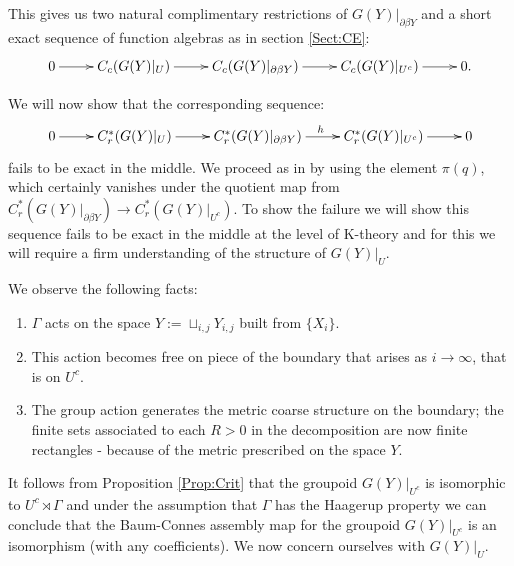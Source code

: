 \documentclass[11pt]{amsart}
\theoremstyle{plain}
\theoremstyle{definition}%
\theoremstyle{remark}%
\begin{document}
This gives us two natural complimentary restrictions of $G(Y)|_{\partial\beta Y}$ and a short exact sequence of function algebras as in section \ref{Sect:CE}:
\begin{equation*}
\xymatrix{
0 \ar[r] & C_{c}(G(Y)|_{U}) \ar[r]& C_{c}(G(Y)|_{\partial\beta Y}) \ar[r] & C_{c}(G(Y)|_{U^{c}}) \ar[r] & 0.
}
\end{equation*}

We will now show that the corresponding sequence:
\begin{equation*}
\xymatrix{
0 \ar[r] & C^{*}_{r}(G(Y)|_{U}) \ar[r]& C_{r}^{*}(G(Y)|_{\partial\beta Y}) \ar[r]^{h} & C_{r}^{*}(G(Y)|_{U^{c}}) \ar[r] & 0
}
\end{equation*}
fails to be exact in the middle. We proceed as in \cite{explg1,MR1911663} by using the element $\pi(q)$, which certainly vanishes under the quotient map from $C^{*}_{r}(G(Y)|_{\partial\beta Y}) \rightarrow C^{*}_{r}(G(Y)|_{U^{c}})$. To show the failure we will show this sequence fails to be exact in the middle at the level of K-theory and for this we will require a firm understanding of the structure of $G(Y)|_{U}$.

We observe the following facts: 
\begin{enumerate}
\item $\Gamma$ acts on the space $Y:=\sqcup_{i,j}Y_{i,j}$ built from $\lbrace X_{i} \rbrace$.
\item This action becomes free on piece of the boundary that arises as $i \rightarrow \infty$, that is on $U^{c}$.
\item The group action generates the metric coarse structure on the boundary; the finite sets associated to each $R>0$ in the decomposition are now finite rectangles - because of the metric prescribed on the space $Y$.
\end{enumerate} 

It follows from Proposition \ref{Prop:Crit} that the groupoid $G(Y)|_{U^{c}}$ is isomorphic to $U^{c}\rtimes \Gamma$ and under the assumption that $\Gamma$ has the Haagerup property we can conclude that the Baum-Connes assembly map for the groupoid $G(Y)|_{U^{c}}$ is an isomorphism (with any coefficients). We now concern ourselves with $G(Y)|_{U}$.
\end{document}
